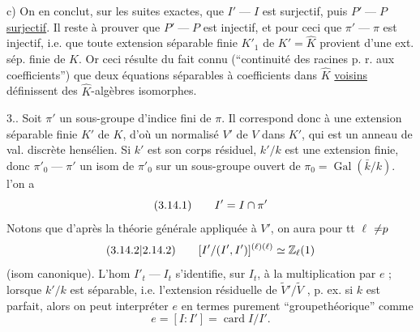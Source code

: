  

c) On en conclut, sur les  suites exactes, que $I'\mathrel{\text{---}}I$ est surjectif, puis $P'\mathrel{\text{---}}P$ \uline{surjectif}.
Il reste à prouver que $P'\mathrel{\text{---}}P$ est injectif, et pour ceci que $\pi'\mathrel{\text{---}}\pi$ est injectif,  i.e. que toute extension séparable finie $K'_1$ de $K'=\widehat K$ provient d'une ext. sép. finie de $K$. Or ceci résulte du fait connu (``continuité des racines p. r. aux coefficients'') que deux équations séparables  à coefficients dans $\widehat K$ \uline{voisins} définissent des  $\widehat K$-algèbres isomorphes.

3.. Soit $\pi'$ un sous-groupe d'indice fini de $\pi$. Il correspond donc à une extension séparable finie $K'$ de $K$, d'où un normalisé $V'$ de $V$ dans $K'$, qui est un anneau de val. discrète hensélien. Si $k'$ est son corps résiduel, $k'/k$ est une extension finie, donc $\pi'_0\mathrel{\text{---}}\pi'$   un isom de $\pi'_0$  sur un sous-groupe ouvert de $\pi_0=\operatorname{Gal}(\bar k/k)$.   l'on a 
\[
(3.{14}.1)\qquad I'=I\cap\pi'
\]
Notons que d'après la théorie générale appliquée à $V'$, on aura pour tt $\ell$  ${\ne}p$
\[
({3.14.2|2.14.2})\qquad [I'/(I',I')]^{{{(\ell)}}(\ell)}\simeq\mathbb Z_\ell(1)
\]
(isom canonique).  L'hom $I'_t\mathrel{\text{---}}I_t$ s'identifie, sur $I_t$, à la multiplication par $e$ ;  lorsque $k'/k$ est séparable,  i.e. l'extension résiduelle de $\widetilde V'/\widetilde V$  ,  p. ex. si $k$ est parfait, alors on peut interpréter $e$ en termes purement ``groupethéorique'' comme
\[
 e=[I:I']=\operatorname{card}I/I'.
\]


